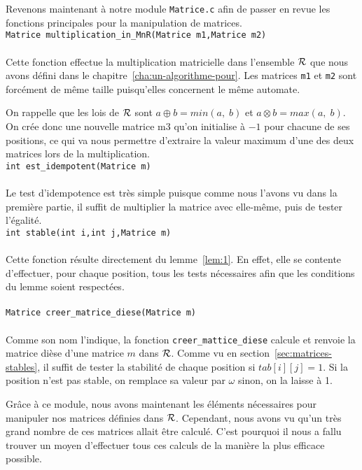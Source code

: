 \documentclass[12pt]{memoir}
\begin{document}
Revenons maintenant à notre module \verb?Matrice.c? afin de passer en revue les fonctions principales pour la manipulation de matrices. \\

\verb?Matrice multiplication_in_MnR(Matrice m1,Matrice m2)?\\\\
Cette fonction effectue la multiplication matricielle dans l'ensemble $\mathcal{R}$ que nous avons défini dans le chapitre~\ref{cha:un-algorithme-pour}. Les matrices \verb?m1? et \verb?m2? sont forcément de même taille puisqu'elles concernent le même automate.

\medskip
On rappelle que les lois de $\mathcal{R}$ sont $a \oplus b = min(a,\;b)$ et $a \otimes b = max(a,\;b)$. On crée donc une nouvelle matrice m3 qu'on initialise à $-1$ pour chacune de ses positions, ce qui va nous permettre d'extraire la valeur maximum d'une des deux matrices lors de la multiplication.\\

\verb?int est_idempotent(Matrice m)?\\\\
Le test d'idempotence est très simple puisque comme nous l'avons vu dans la première partie, il suffit de multiplier la matrice avec elle-même, puis de tester l'égalité.\\

\verb?int stable(int i,int j,Matrice m)?\\\\
Cette fonction résulte directement du lemme~\ref{lem:1}. En effet, elle se contente d'effectuer, pour chaque position, tous les tests nécessaires afin que les conditions du lemme soient respectées.\\\\

\verb?Matrice creer_matrice_diese(Matrice m)?\\\\
Comme son nom l'indique, la fonction \verb?creer_mattice_diese? calcule et
renvoie la matrice dièse d'une matrice $m$ dans $\mathcal{R}$. Comme vu en
section~\ref{sec:matrices-stables}, il suffit de tester la stabilité de chaque
position si $tab[i][j] = 1$. Si la position n'est pas stable, on remplace sa
valeur par $\omega$ sinon, on la laisse à 1.

\bigskip

Grâce à ce module, nous avons maintenant les éléments nécessaires pour manipuler nos matrices définies dans $\mathcal{R}$. Cependant, nous avons vu qu'un très grand nombre de ces matrices allait être calculé. C'est pourquoi il nous a fallu trouver un moyen d'effectuer tous ces calculs de la manière la plus efficace possible.
\end{document}
